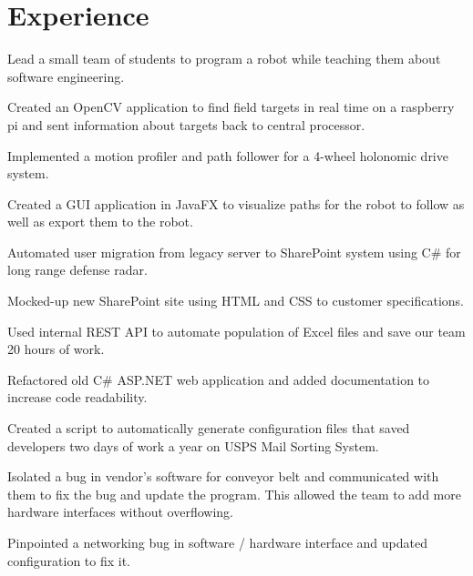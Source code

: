 \documentclass[]{deedy-resume-openfont}
\begin{document}
    
%
%

%
%
\section{Experience}
\hfill {}
\begin{tightemize}
	\item Lead a small team of students to program a robot while teaching them about software engineering.
	\item Created an OpenCV application to find field targets in real time on a raspberry pi and sent information about targets back to central processor.
	\item Implemented a motion profiler and path follower for a 4-wheel holonomic drive system.
	\item Created a GUI application in JavaFX to visualize paths for the robot to follow as well as export them to the robot.
\end{tightemize}
\sectionsep
{}\hfill {}
\begin{tightemize}
	\item Automated user migration from legacy server to SharePoint system using C\# for long range defense radar.
	\item Mocked-up new SharePoint site using HTML and CSS to customer specifications.
	\item Used internal REST API to automate population of Excel files and save our team 20 hours of work.
	\item Refactored old C\# ASP.NET web application and added documentation to increase code readability.
\end{tightemize}
\sectionsep
{}\hfill {}
\begin{tightemize}
	\item Created a script to automatically generate configuration files that saved developers two days of work a year on USPS Mail Sorting System.
	\item Isolated a bug in vendor's software for conveyor belt and communicated with them to fix the bug and update the program. This allowed the team to add more hardware interfaces without overflowing. 
	\item Pinpointed a networking bug in software / hardware interface and updated configuration to fix it.
\end{tightemize}
\end{document}
